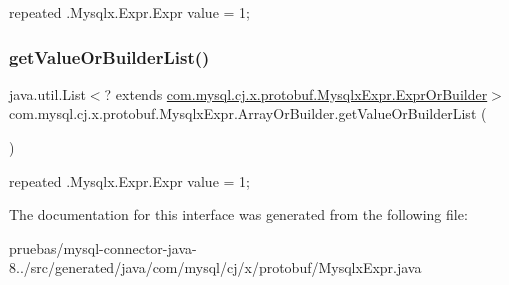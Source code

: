 {\ttfamily repeated .Mysqlx.\+Expr.\+Expr value = 1;} \mbox{\label{interfacecom_1_1mysql_1_1cj_1_1x_1_1protobuf_1_1_mysqlx_expr_1_1_array_or_builder_a5848db086fca6625e7bab2d9be6b1ea8}} 
\subsubsection{\texorpdfstring{get\+Value\+Or\+Builder\+List()}{getValueOrBuilderList()}}
{\footnotesize\ttfamily java.\+util.\+List$<$? extends \mbox{\hyperlink{interfacecom_1_1mysql_1_1cj_1_1x_1_1protobuf_1_1_mysqlx_expr_1_1_expr_or_builder}{com.\+mysql.\+cj.\+x.\+protobuf.\+Mysqlx\+Expr.\+Expr\+Or\+Builder}}$>$ com.\+mysql.\+cj.\+x.\+protobuf.\+Mysqlx\+Expr.\+Array\+Or\+Builder.\+get\+Value\+Or\+Builder\+List (\begin{DoxyParamCaption}{ }\end{DoxyParamCaption})}

{\ttfamily repeated .Mysqlx.\+Expr.\+Expr value = 1;} 

The documentation for this interface was generated from the following file\+:\begin{DoxyCompactItemize}
\item 
pruebas/mysql-\/connector-\/java-\/8../src/generated/java/com/mysql/cj/x/protobuf/Mysqlx\+Expr.\+java\end{DoxyCompactItemize}
